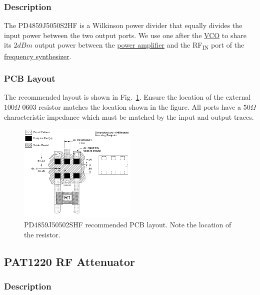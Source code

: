 \subsubsection{Description}
\label{sec:pd4859j5050s2hf-description}

The PD4859J5050S2HF is a Wilkinson power divider that equally divides the input power between the
two output ports. We use one after the \hyperref[sec:hmc431lp4rf]{VCO} to share its $2 \si{dBm}$
output power between the \hyperref[sec:se2567l]{power amplifier} and the RF\textsubscript{IN} port
of the \hyperref[sec:adf4158]{frequency synthesizer}.

\subsubsection{PCB Layout}
\label{sec:pd4859j50502shf-pcb}

The recommended layout is shown in Fig.~\ref{fig:pd4859j50502shf-pcb}. Ensure the location of the
external $100 \si{\Omega}$ 0603 resistor matches the location shown in the figure. All ports have a
$50 \si{\Omega}$ characteristic impedance which must be matched by the input and output traces.

\begin{figure}[h]
        \centering
        \includegraphics[width=0.5\textwidth]{data/pd4859j50502shf-pcb}
        \caption{PD4859J50502SHF recommended PCB layout. Note the location of the resistor.}
        \label{fig:pd4859j50502shf-pcb}
\end{figure}

\subsection{PAT1220 RF Attenuator}
\label{sec:pat1220}

\subsubsection{Description}
\label{sec:pat1220-description}

